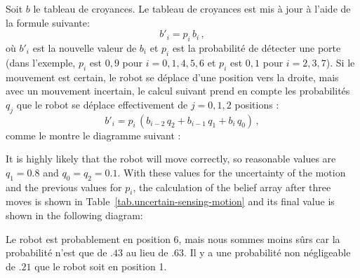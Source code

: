 Soit $b$ le tableau de croyances. Le tableau de croyances est mis à jour à l'aide de la formule suivante:
\begin{displaymath}
b'_i = p_i \, b_i\,,
\end{displaymath}
où $b'_i$ est la nouvelle valeur de $b_i$ et $p_i$ est la probabilité de détecter une porte (dans l'exemple, $p_i$ est $0,9$ pour $i=0,1,4,5,6$ et $p_i$ est $0,1$ pour $i=2,3,7$). Si le mouvement est certain, le robot se déplace d'une position vers la droite, mais avec un mouvement incertain, le calcul suivant prend en compte les probabilités $q_j$ que le robot se déplace effectivement de $j=0,1,2$ positions :
\begin{displaymath}
b'_i = p_i \,(b_{i-2}\, q_2 + b_{i-1}\, q_1 + b_{i}\, q_0)\,,
\end{displaymath}
comme le montre le diagramme suivant :
\begin{center}
\end{center}
It is highly likely that the robot will move correctly, so reasonable values are $q_1=0.8$ and $q_0=q_2=0.1$. With these values for the uncertainty of the motion and the previous values for $p_i$, the calculation of the belief array after three moves is shown in Table~\ref{tab.uncertain-sensing-motion} and its final value is shown in the following diagram:
\begin{center}
\end{center}
Le robot est probablement en position 6, mais nous sommes moins sûrs car la probabilité n'est que de $.43$ au lieu de $.63$. Il y a une probabilité non négligeable de $.21$ que le robot soit en position 1.

